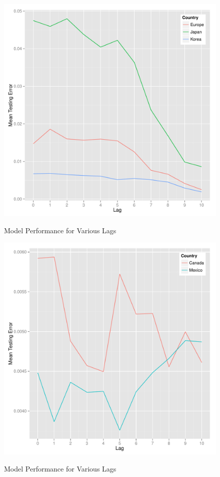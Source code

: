 \documentclass{sig-alternate-05-2015}
\begin{document}
\begin{figure}
\centering
\caption{Model Performance for Various Lags}
\includegraphics[scale=0.45]{lag2.pdf}
\label{fig:lag2}
\end{figure}

\begin{figure}
\centering
\caption{Model Performance for Various Lags}
\includegraphics[scale=0.45]{ForestLag1.pdf}
\label{fig:ForestLag1}
\end{figure}
\end{document}
